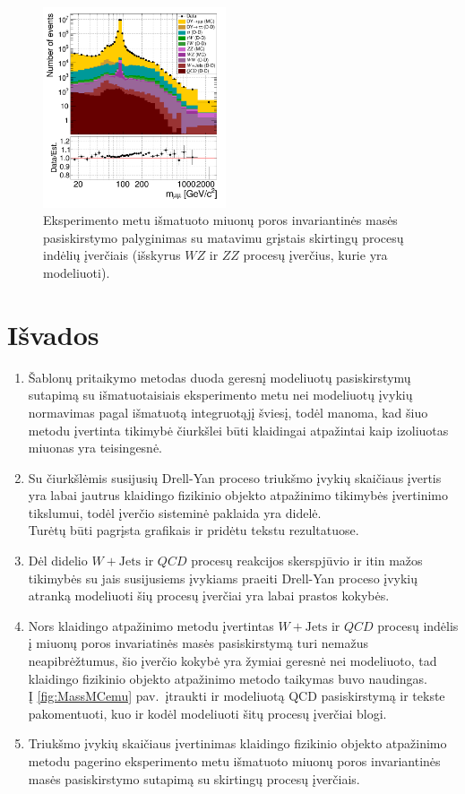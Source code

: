\documentclass[a4paper, 12pt, oneside]{article}
\newcommand{\textred}[1]{{\color{Red}#1}}
\newcommand{\commentMA}[1]{\textred{#1}\newline}
\newcommand{\ZZ}{Z\! Z}
\newcommand{\WZ}{W\! Z}
\newcommand{\WJets}{W\! +\!\mathrm{Jets}}
\newcommand{\QCD}{QC\! D}
\begin{document}
\begin{figure}[H]
	\includegraphics[width=0.48\textwidth]{Kursinis3/Mass_allEst.png}
	\vspace{-0.5cm}
	\caption{\label{fig:MassFinal}
		Eksperimento metu išmatuoto miuonų poros invariantinės masės pasiskirstymo palyginimas su matavimu grįstais
		skirtingų procesų indėlių įverčiais (išskyrus $\WZ$ ir $\ZZ$ procesų įverčius, kurie yra modeliuoti).}
\end{figure}

\section{Išvados}
\begin{enumerate}
	\item Šablonų pritaikymo metodas duoda geresnį modeliuotų pasiskirstymų sutapimą su išmatuotaisiais eksperimento metu
	nei modeliuotų įvykių normavimas pagal išmatuotą integruotąjį šviesį, todėl manoma, kad šiuo metodu įvertinta
	tikimybė čiurkšlei būti klaidingai atpažintai kaip izoliuotas miuonas yra teisingesnė.
	\item Su čiurkšlėmis susijusių Drell-Yan proceso triukšmo įvykių skaičiaus įvertis yra labai jautrus klaidingo
	fizikinio objekto atpažinimo tikimybės įvertinimo tikslumui, todėl įverčio sisteminė paklaida yra didelė.
	\commentMA{\\Turėtų būti pagrįsta grafikais ir pridėtu tekstu rezultatuose.}
	\item Dėl didelio $\WJets$ ir $\QCD$ procesų reakcijos skerspjūvio ir itin mažos tikimybės su jais susijusiems įvykiams praeiti
	Drell-Yan proceso įvykių atranką modeliuoti šių procesų įverčiai yra labai prastos kokybės.
	\item Nors klaidingo atpažinimo metodu įvertintas $\WJets$ ir $\QCD$ procesų indėlis į miuonų poros invariatinės masės
	pasiskirstymą turi nemažus neapibrėžtumus, šio įverčio kokybė yra žymiai geresnė nei modeliuoto, tad klaidingo fizikinio
	objekto atpažinimo metodo taikymas buvo naudingas.
	\commentMA{\\Į \ref{fig:MassMCemu} pav.\ įtraukti ir modeliuotą QCD pasiskirstymą ir tekste pakomentuoti, kuo ir kodėl
	modeliuoti šitų procesų įverčiai blogi.}
	\item Triukšmo įvykių skaičiaus įvertinimas klaidingo fizikinio objekto atpažinimo metodu pagerino eksperimento
	metu išmatuoto miuonų poros invariantinės masės pasiskirstymo sutapimą su skirtingų procesų įverčiais.
\end{enumerate}
\end{document}
